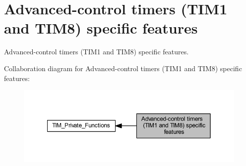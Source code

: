 \hypertarget{group___t_i_m___group4}{}\section{Advanced-\/control timers (T\+I\+M1 and T\+I\+M8) specific features}
\label{group___t_i_m___group4}


Advanced-\/control timers (T\+I\+M1 and T\+I\+M8) specific features.  


Collaboration diagram for Advanced-\/control timers (T\+I\+M1 and T\+I\+M8) specific features\+:\nopagebreak
\begin{figure}[H]
\begin{center}
\leavevmode
\includegraphics[width=350pt]{group___t_i_m___group4}
\end{center}
\end{figure}
